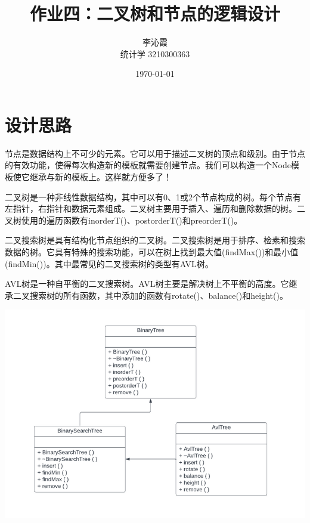 \documentclass[a4paper]{article}
\title{\textbf{作业四：二叉树和节点的逻辑设计}}
\author{李沁霞 \\ 统计学 3210300363}
\date{\today}
\begin{document}
\maketitle

\section{设计思路}
节点是数据结构上不可少的元素。它可以用于描述二叉树的顶点和级别。由于节点的有效功能，使得每次构造新的模板就需要创建节点。我们可以构造一个Node模板使它继承与新的模板上。这样就方便多了！

二叉树是一种非线性数据结构，其中可以有0、1或2个节点构成的树。每个节点有左指针，右指针和数据元素组成。二叉树主要用于插入、遍历和删除数据的树。二叉树使用的遍历函数有inorderT()、postorderT()和preorderT()。

二叉搜索树是具有结构化节点组织的二叉树。二叉搜索树是用于排序、检素和搜索数据的树。它具有特殊的搜索功能，可以在树上找到最大值(findMax())和最小值(findMin())。其中最常见的二叉搜索树的类型有AVL树。

AVL树是一种自平衡的二叉搜索树。AVL树主要是解决树上不平衡的高度。它继承二叉搜索树的所有函数，其中添加的函数有rotate()、balance()和height()。

\begin{center}
\includegraphics[scale=0.5]{uml}
\end{center}
\end{document}
